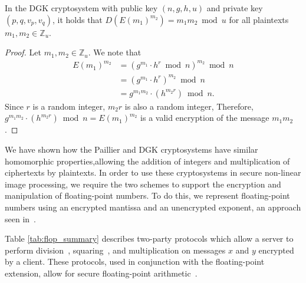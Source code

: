 \begin{theorem}
    In the DGK cryptosystem with public key $(n,g,h,u)$ and private key $(p,q,v_p,v_q)$, it holds that $D(E(m_1)^{m_2}) = m_1m_2\bmod u$ for all plaintexts $m_1,m_2 \in \mathbb{Z}_u$.
\end{theorem}
\begin{proof}
  Let $m_1,m_2 \in \mathbb{Z}_u$.
  We note that
  \begin{align*}
    E(m_1)^{m_2} 
    &= (g^{m_1} \cdot h^r \bmod{n})^{m_2} \bmod n \\
    &= (g^{m_1} \cdot h^r)^{m_2} \bmod{n}\\
    &= g^{m_1m_2} \cdot (h^{m_2r}) \bmod{n}.
  \end{align*}
  Since $r$ is a random integer, $m_2r$ is also a random integer, Therefore, $g^{m_1m_2} \cdot (h^{m_2r}) \bmod{n} = E(m_1)^{m_2}$ is a valid encryption of the message $m_1m_2$.
\end{proof}

We have shown how the Paillier and DGK cryptosystems have similar homomorphic properties,allowing the addition of integers and multiplication of ciphertexts by plaintexts.
In order to use these cryptosystems in secure non-linear image processing, we require the two schemes to support the encryption and manipulation of floating-point numbers. To do this, we represent floating-point numbers using an encrypted mantissa and an unencrypted exponent, an approach seen in~\cite{ziad_cryptoimg:_2016}. 

Table \ref{tab:flop_summary} describes two-party protocols which allow a server to perform division~\cite{boukoros_lightweight_2017}, squaring~\cite{hutchison_privacy-preserving_2009}, and multiplication on messages $x$ and $y$ encrypted by a client. These protocols, used in conjunction with the floating-point extension, allow for secure floating-point arithmetic~\cite{pcsc-paper}.

